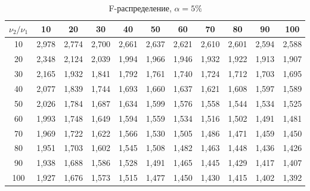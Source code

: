 \documentclass[12pt,a4paper]{article}
\begin{document}
\begin{table}[htbp]
  \centering
  \caption{F-распределение, $\alpha=5\%$}
    \begin{tabular}{crrrrrrrrrr}
    \toprule
    $\nu_2/\nu_1$  & \multicolumn{1}{c}{           10   } & \multicolumn{1}{c}{           20   } & \multicolumn{1}{c}{           30   } & \multicolumn{1}{c}{           40   } & \multicolumn{1}{c}{           50   } & \multicolumn{1}{c}{           60   } & \multicolumn{1}{c}{           70   } & \multicolumn{1}{c}{           80   } & \multicolumn{1}{c}{           90   } & \multicolumn{1}{c}{         100   } \\
    \midrule
    10    & 2,978 & 2,774 & 2,700 & 2,661 & 2,637 & 2,621 & 2,610 & 2,601 & 2,594 & 2,588 \\
    20    & 2,348 & 2,124 & 2,039 & 1,994 & 1,966 & 1,946 & 1,932 & 1,922 & 1,913 & 1,907 \\
    30    & 2,165 & 1,932 & 1,841 & 1,792 & 1,761 & 1,740 & 1,724 & 1,712 & 1,703 & 1,695 \\
    40    & 2,077 & 1,839 & 1,744 & 1,693 & 1,660 & 1,637 & 1,621 & 1,608 & 1,597 & 1,589 \\
    50    & 2,026 & 1,784 & 1,687 & 1,634 & 1,599 & 1,576 & 1,558 & 1,544 & 1,534 & 1,525 \\
    60    & 1,993 & 1,748 & 1,649 & 1,594 & 1,559 & 1,534 & 1,516 & 1,502 & 1,491 & 1,481 \\
    70    & 1,969 & 1,722 & 1,622 & 1,566 & 1,530 & 1,505 & 1,486 & 1,471 & 1,459 & 1,450 \\
    80    & 1,951 & 1,703 & 1,602 & 1,545 & 1,508 & 1,482 & 1,463 & 1,448 & 1,436 & 1,426 \\
    90    & 1,938 & 1,688 & 1,586 & 1,528 & 1,491 & 1,465 & 1,445 & 1,429 & 1,417 & 1,407 \\
    100   & 1,927 & 1,676 & 1,573 & 1,515 & 1,477 & 1,450 & 1,430 & 1,415 & 1,402 & 1,392 \\
    \bottomrule
    \end{tabular}%
  \label{tab:addlabel}%
\end{table}%
\end{document}
